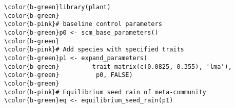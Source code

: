 \documentclass[class=minimal,border=0]{standalone}
\begin{document}
%
\begin{BVerbatim}
\color{b-green}library(plant)
\color{b-green}
\color{b-pink}# baseline control parameters
\color{b-green}p0 <- scm_base_parameters()
\color{b-green}
\color{b-pink}# Add species with specified traits
\color{b-green}p1 <- expand_parameters(
\color{b-green}         trait_matrix(c(0.0825, 0.355), 'lma'),
\color{b-green}          p0, FALSE)
\color{b-green}
\color{b-pink}# Equilibrium seed rain of meta-community
\color{b-green}eq <- equilibrium_seed_rain(p1)
\end{BVerbatim}
\end{document}
